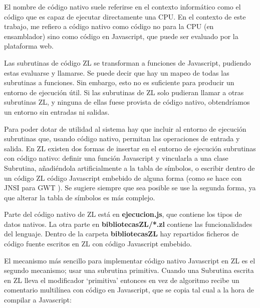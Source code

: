 \documentclass{report}
\begin{document}
	
	El nombre de código nativo suele referirse en el contexto informático como el código que es capaz de ejecutar directamente una CPU. En el contexto de este trabajo, me refiero a código nativo como código no para la CPU (en ensamblador) sino como código en Javascript, que puede ser evaluado por la plataforma web. 
	
	\vspace{10px}
	
	Las subrutinas de código ZL se transforman a funciones de Javascript, pudiendo estas evaluarse y llamarse. Se puede decir que hay un mapeo de todas las subrutinas a funciones. Sin embargo, esto no es suficiente para producir un entorno de ejecución útil. Si las subrutinas de ZL solo pudieran llamar a otras subrutinas ZL, y ninguna de ellas fuese provista de código nativo, obtendríamos un entorno sin entradas ni salidas. 
	
	\vspace{10px}
	
	Para poder dotar de utilidad al sistema hay que incluir al entorno de ejecución subrutinas que, usando código nativo, permitan las operaciones de entrada y salida. En ZL existen dos formas de insertar en el entorno de ejecución subrutinas con código nativo: definir una función Javascript y vincularla a una clase Subrutina, añadiéndola artificialmente a la tabla de símbolos, o escribir dentro de un código ZL código Javascript embebido de alguna forma (como se hace con JNSI para GWT \cite{jnsigwt}). Se sugiere siempre que sea posible se use la segunda forma, ya que alterar la tabla de símbolos es más complejo.
	
	\vspace{10px}
	
	Parte del código nativo de ZL está en \textbf{ejecucion.js}, que contiene los tipos de datos nativos. La otra parte en \textbf{bibliotecasZL/*.zl} contiene las funcionalidades del lenguaje. Dentro de la carpeta \textbf{bibliotecasZL} hay repartidos ficheros de código fuente escritos en ZL con código Javascript embebido.
	
	\vspace{10px}
	
	\label{subrutinasprimitivas}
	El mecanismo más sencillo para implementar código nativo Javascript en ZL es el segundo mecanismo; usar una subrutina primitiva. Cuando una Subrutina escrita en ZL lleva el modificador `primitiva' entonces en vez de algoritmo recibe un comentario multilínea con código en Javascript, que se copia tal cual a la hora de compilar a Javascript:
	
\end{document}
